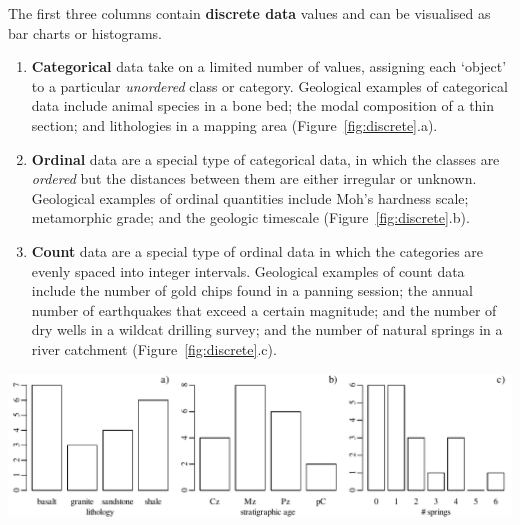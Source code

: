 The first three columns contain \textbf{discrete data} values and can
be visualised as bar charts or histograms.

\begin{enumerate}

\item\textbf{Categorical} data take on a limited number of values,
  assigning each `object' to a particular \emph{unordered} class or
  category. Geological examples of categorical data include animal
  species in a bone bed; the modal composition of a thin section; and
  lithologies in a mapping area (Figure~\ref{fig:discrete}.a).

\item\textbf{Ordinal} data are a special type of categorical data, in
  which the classes are \emph{ordered} but the distances between them
  are either irregular or unknown. Geological examples of ordinal
  quantities include Moh's hardness scale; metamorphic grade; and the
  geologic timescale (Figure~\ref{fig:discrete}.b).

\item\textbf{Count} data are a special type of ordinal data in which
  the categories are evenly spaced into integer intervals. Geological
  examples of count data include the number of gold chips found in a
  panning session; the annual number of earthquakes that exceed a
  certain magnitude; and the number of dry wells in a wildcat drilling
  survey; and the number of natural springs in a river catchment
  (Figure~\ref{fig:discrete}.c).

\end{enumerate}

\noindent\includegraphics[width=\textwidth]{../figures/discrete.pdf}\medskip
\begingroup {}
\label{fig:discrete}
\endgroup

